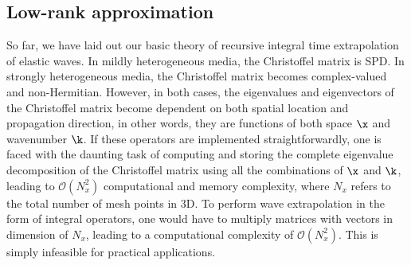 \subsection{Low-rank approximation}
So far, we have laid out our basic theory of recursive integral time extrapolation of elastic waves. In mildly heterogeneous media, the Christoffel matrix is SPD. In strongly heterogeneous media, the Christoffel matrix becomes complex-valued and non-Hermitian. However, in both cases, the eigenvalues and eigenvectors of the Christoffel matrix become dependent on both spatial location and propagation direction, in other words, they are functions of both space $\x$ and wavenumber $\k$. If these operators are implemented straightforwardly, one is faced with the daunting task of computing and storing the complete eigenvalue decomposition of the Christoffel matrix using all the combinations of $\x$ and $\k$, leading to $\mathcal{O}(N_x^2)$ computational and memory complexity, where $N_x$ refers to the total number of mesh points in $3$D. To perform wave extrapolation in the form of integral operators, one would have to multiply matrices with vectors in dimension of $N_x$, leading to a computational complexity of $\mathcal{O}(N_x^2)$. This is simply infeasible for practical applications.


